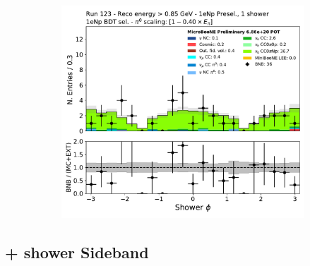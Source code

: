 \begin{figure}[H]
\begin{subfigure}{0.3\textwidth}
    \caption{}
    \end{subfigure}
    \begin{subfigure}{0.3\textwidth}
    \includegraphics[width=1.0\textwidth]{Sidebands/Figures/1eNp/HighEnergy/HiEext_NPOneShr_NPBDT_pi0e040/shr_phi.pdf}
    \caption{}
    \end{subfigure}
    \caption{} 
    \label{fig:HE_1eNp_10}
\end{figure}

\subsection{+ shower Sideband}
